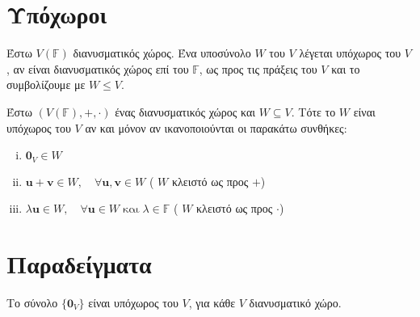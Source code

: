 \documentclass[a4paper,table]{report}
\begin{document}
\section{Υπόχωροι}

\begin{dfn}
\item {}
  Έστω $V(\mathbb{F}) $ διανυσματικός χώρος. Ένα υποσύνολο $W$ του $V$ λέγεται 
  \textcolor{Col2}{υπόχωρος} του $ V $, αν είναι διανυσματικός χώρος επί του 
  $ \mathbb{F} $, ως προς τις πράξεις του $V$ και το συμβολίζουμε με $ W \leq V $.
\end{dfn}

\begin{prop}
  \label{prop:subsp}
\item {}
  Έστω $ (V(\mathbb{F}),+,\cdot) $ ένας διανυσματικός χώρος και $ W \subseteq V $.  
  Τότε το $ W $ είναι υπόχωρος του $V$ αν και μόνον αν ικανοποιούνται οι 
  παρακάτω συνθήκες:
  \begin{enumerate}[i)]
    \item $ \mathbf{0}_{V} \in W $
    \item $ \mathbf{u}+ \mathbf{v} \in W, \quad \forall \mathbf{u}, 
      \mathbf{v} \in W $ \quad ( $W$ κλειστό ως προς $ + $)
    \item $ \lambda \mathbf{u} \in W, \quad \forall \mathbf{u} \in W \; 
      \text{και} \; \lambda \in \mathbb{F} $ \quad ( $W$ κλειστό ως προς 
      $ \cdot $)
  \end{enumerate}
\end{prop}


\section{Παραδείγματα}

\begin{example}
  Το σύνολο $ \{ \mathbf{0}_{V} \} $ είναι υπόχωρος του $V$, 
  για κάθε $V$ διανυσματικό χώρο.
\end{example}
\end{document}
